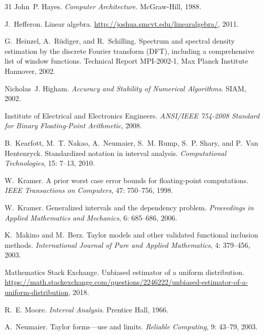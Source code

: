 \documentclass[twoside]{article}
\numberwithin{equation}{section}
\begin{document}
\begin{thebibliography}{31}
John~P. Hayes.
\newblock \emph{Computer Architecture}.
\newblock McGraw-Hill, 1988.

J.~Hefferon.
\newblock Linear algebra.
\newblock \url{http://joshua.smcvt.edu/linearalgebra/}, 2011.

G.~Heinzel, A.~R{\"u}diger, and R.~Schilling.
\newblock Spectrum and spectral density estimation by the discrete {Fourier}
  transform ({DFT}), including a comprehensive list of window functions.
\newblock Technical Report MPI-2002-1, Max Planck Institute Hannover, 2002.

Nicholas~J. Higham.
\newblock \emph{Accuracy and Stability of Numerical Algorithms}.
\newblock SIAM, 2002.

{Institute of Electrical and Electronics Engineers}.
\newblock \emph{ANSI/IEEE 754-2008 Standard for Binary Floating-Point
  Arithmetic}, 2008.

B.~Kearfott, M.~T. Nakao, A.~Neumaier, S.~M. Rump, S.~P. Shary, and P.~Van
  Hentenryck.
\newblock Standardized notation in interval analysis.
\newblock \emph{Computational Technologies}, 15: 7--13, 2010.

W.~Kramer.
\newblock A prior worst case error bounds for floating-point computations.
\newblock \emph{IEEE Transactions on Computers}, 47: 750--756, 1998.

W.~Kramer.
\newblock Generalized intervals and the dependency problem.
\newblock \emph{Proceedings in Applied Mathematics and Mechanics}, 6:
  685--686, 2006.

K.~Makino and M.~Berz.
\newblock Taylor models and other validated functional inclusion methods.
\newblock \emph{International Journal of Pure and Applied Mathematics},
  4: 379--456, 2003.

{Mathematics Stack Exchange}.
\newblock Unbiased estimator of a uniform distribution.
\newblock
  \url{https://math.stackexchange.com/questions/2246222/unbiased-estimator-of-a-uniform-distribution},
  2018.

R.~E. Moore.
\newblock \emph{Interval Analysis}.
\newblock Prentice Hall, 1966.

A.~Neumaier.
\newblock Taylor forms---use and limits.
\newblock \emph{Reliable Computing}, 9: 43--79, 2003.


\end{thebibliography}
\end{document}
